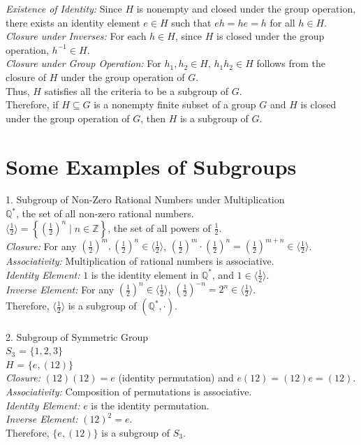 \textit{Existence of Identity:} Since \( H \) is nonempty and closed under the group operation, there exists an identity element \( e \in H \) such that \( eh = he = h \) for all \( h \in H \).
\\
\textit{Closure under Inverses:} For each \( h \in H \), since \( H \) is closed under the group operation, \( h^{-1} \in H \).
\\
\textit{Closure under Group Operation:} For \( h_1, h_2 \in H \), \( h_1 h_2 \in H \) follows from the closure of \( H \) under the group operation of \( G \).
\\
Thus, \( H \) satisfies all the criteria to be a subgroup of \( G \).
\\
Therefore, if \( H \subseteq G \) is a nonempty finite subset of a group \( G \) and \( H \) is closed under the group operation of \( G \), then \( H \) is a subgroup of \( G \).

\section{Some Examples of Subgroups}
1. Subgroup of Non-Zero Rational Numbers under Multiplication
\\
$\mathbb{Q}^*$, the set of all non-zero rational numbers.
\\
$\langle \frac{1}{2} \rangle = \left\{ \left( \frac{1}{2} \right)^n \mid n \in \mathbb{Z} \right\}$, the set of all powers of $\frac{1}{2}$.
\\
\textit{Closure:} For any $\left( \frac{1}{2} \right)^m, \left( \frac{1}{2} \right)^n \in \langle \frac{1}{2} \rangle$, $\left( \frac{1}{2} \right)^m \cdot \left( \frac{1}{2} \right)^n = \left( \frac{1}{2} \right)^{m+n} \in \langle \frac{1}{2} \rangle$.
\\
\textit{Associativity:} Multiplication of rational numbers is associative.
\\
\textit{Identity Element:} $1$ is the identity element in $\mathbb{Q}^*$, and $1 \in \langle \frac{1}{2} \rangle$.
\\
\textit{Inverse Element:} For any $\left( \frac{1}{2} \right)^n \in \langle \frac{1}{2} \rangle$, $\left( \frac{1}{2} \right)^{-n} = 2^n \in \langle \frac{1}{2} \rangle$.
\\
Therefore, $\langle \frac{1}{2} \rangle$ is a subgroup of $(\mathbb{Q}^*, \cdot)$.
\\
\\
2. Subgroup of Symmetric Group\\
$S_3$ = $\{1, 2, 3\}$\\
\(H\) = $\{ e, (12) \}$\\
\textit{Closure:} $(12)(12) = e$ (identity permutation) and $e(12) = (12)e = (12)$.
\\
\textit{Associativity:} Composition of permutations is associative.
\\
\textit{Identity Element:} $e$ is the identity permutation.
\\
\textit{Inverse Element:} $(12)^2 = e$.
\\
Therefore, $\{ e, (12) \}$ is a subgroup of $S_3$.


